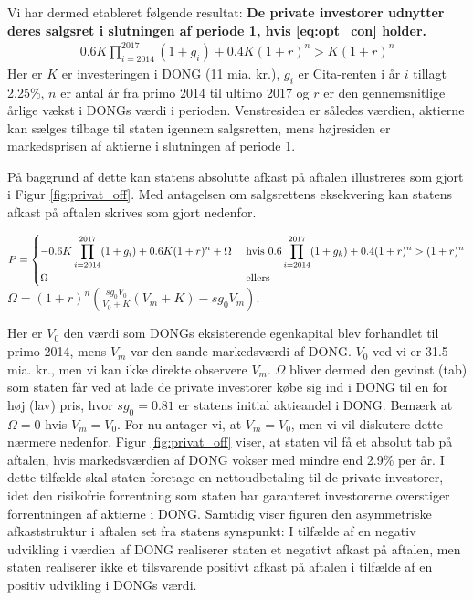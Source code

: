 \documentclass{article}
\begin{document}





Vi har dermed etableret følgende resultat: \textbf{De private investorer udnytter deres salgsret i slutningen af periode 1, hvis \eqref{eq:opt_con} holder. } 
\begin{align}
0.6K\prod_{i=2014}^{2017}(1+g_i)+0.4K(1+r)^n>K(1+r)^n \label{eq:opt_con}
\end{align}
Her er $K$ er investeringen i DONG (11 mia. kr.), $g_i$ er Cita-renten i år $i$ tillagt 2.25\%, $n$ er antal år fra primo 2014 til ultimo 2017 og $r$ er den gennemsnitlige årlige vækst i DONGs værdi i perioden. Venstresiden er således værdien, aktierne kan sælges tilbage til staten igennem salgsretten, mens højresiden er markedsprisen af aktierne i slutningen af periode 1.

På baggrund af dette kan statens absolutte afkast på aftalen illustreres som gjort i Figur \ref{fig:privat_off}. Med antagelsen om salgsrettens eksekvering kan statens afkast på aftalen skrives som gjort nedenfor. %

$P=\begin{dcases} 
-0.6K \prod_{i=2014}^{2017} (1+g_i)+0.6K(1+r)^n +\Omega&\text{     hvis    } 0.6\prod_{i=2014}^{2017}(1+g_k)+0.4(1+r)^n>(1+r)^n \\ 
\Omega  &\text{   ellers } 
\end {dcases} $\\
 $\Omega=(1+r)^n\left( \frac{sg_0 V_0}{V_0+K} \left( V_m+K \right)-sg_0 V_m \right)$.

Her er $V_0$ den værdi som DONGs eksisterende egenkapital blev forhandlet til primo 2014, mens $V_m$ var den sande markedsværdi af DONG. $V_0$ ved vi er 31.5 mia. kr., men vi kan ikke direkte observere $V_m$. $\Omega$ bliver dermed den gevinst (tab) som staten får ved at lade de private investorer købe sig ind i DONG til en for høj (lav) pris, hvor $sg_0=0.81$ er statens initial aktieandel i DONG. Bemærk at $\Omega=0$ hvis $V_m=V_0$. For nu antager vi, at $V_m=V_0$, men vi vil diskutere dette nærmere nedenfor. Figur \ref{fig:privat_off} viser, at staten vil få et absolut tab på aftalen, hvis markedsværdien af DONG vokser med mindre end 2.9\% per år. I dette tilfælde skal staten foretage en nettoudbetaling til de private investorer, idet den risikofrie forrentning som staten har garanteret investorerne overstiger forrentningen af aktierne i DONG. Samtidig viser figuren den asymmetriske afkaststruktur i aftalen set fra statens synspunkt: I tilfælde af en negativ udvikling i værdien af DONG realiserer staten et negativt afkast på aftalen, men staten realiserer ikke et tilsvarende positivt afkast på aftalen i tilfælde af en positiv udvikling i DONGs værdi. 
\end{document}

